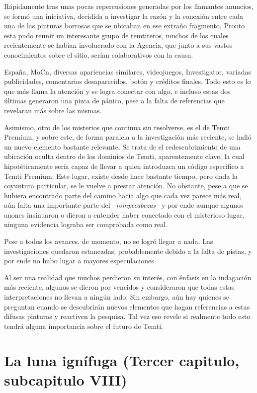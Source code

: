 \documentclass[
  spanish,
]{book}
\begin{document}
Rápidamente tras unas pocas repercusiones generadas por los flamantes anuncios, se formó una iniciativa, decidida a investigar la razón y la conexión entre cada una de las pinturas borrosas que se ubicaban en ese extraño fragmento. Pronto esta pudo reunir un interesante grupo de temtiteros, muchos de los cuales recientemente se habían involucrado con la Agencia, que junto a sus vastos conocimientos sobre el sitio, serían colaborativos con la causa.

España, MoCn, diversas apariencias similares, videojuegos, Investigator, variadas publicidades, comentarios desaparecidos, botón y créditos finales. Todo esto es lo que más llama la atención y se logra conectar con algo, e incluso estas dos últimas generaron una pizca de pánico, pese a la falta de referencias que revelaran más sobre las mismas.

Asimismo, otro de los misterios que continua sin resolverse, es el de Temti Premium, y sobre este, de forma paralela a la investigación más reciente, se halló un nuevo elemento bastante relevante. Se trata de el redescubrimiento de una ubicación oculta dentro de los dominios de Temti, aparentemente clave, la cual hipotéticamente sería capaz de llevar a quien introduzca un código especifico a Temti Premium. Este lugar, existe desde hace bastante tiempo, pero dada la coyuntura particular, se le vuelve a prestar atención.
No obstante, pese a que se hubiera encontrado parte del camino hacia algo que cada vez parece más real, aún falta una importante parte del \emph{--rompecabezas--} y por ende aunque algunos anones insinuaron o dieron a entender haber conectado con el misterioso lugar, ninguna evidencia lograba ser comprobada como real.

Pese a todos los avances, de momento, no se logró llegar a nada. Las investigaciones quedaron estancadas, probablemente debido a la falta de pistas, y por ende no hubo lugar a mayores especulaciones.

Al ser una realidad que muchos perdieron su interés, con énfasis en la indagación más reciente, algunos se dieron por vencidos y consideraron que todas estas interpretaciones no llevan a ningún lado. Sin embargo, aún hay quienes se preguntan cuando se descubrirán nuevos elementos que hagan referencias a estas difusas pinturas y reactiven la pesquisa. Tal vez eso revele si realmente todo esto tendrá alguna importancia sobre el futuro de Temti.

\hypertarget{la-luna-ignuxedfuga-tercer-capitulo-subcapitulo-viii}{%
\section{La luna ignífuga (Tercer capitulo, subcapitulo VIII)}\label{la-luna-ignuxedfuga-tercer-capitulo-subcapitulo-viii}}
\end{document}

